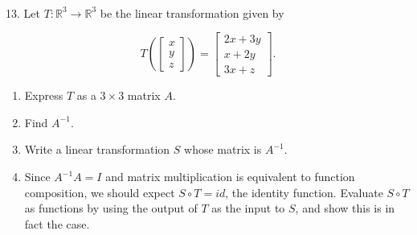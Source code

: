 \documentclass{article}
\begin{document}
~\\

13. Let $T : \mathbb{R}^3 \to \mathbb{R}^3$ be the linear transformation given by

$$
	T \left( \left[\begin{array}{c} x \\ y \\ z \end{array}\right] \right) = \left[\begin{array}{c} 2x + 3y \\ x + 2y \\ 3x + z \end{array}\right].
$$

\begin{enumerate}

	\item Express $T$ as a $3 \times 3$ matrix $A$.

	\item Find $A^{-1}$.

	\item Write a linear transformation $S$ whose matrix is $A^{-1}$.

	\item Since $A^{-1}A = I$ and matrix multiplication is equivalent to function composition, we should expect $S \circ T = id$, the identity function. Evaluate $S \circ T$ as functions by using the output of $T$ as the input to $S$, and show this is in fact the case.

\end{enumerate}
\end{document}
